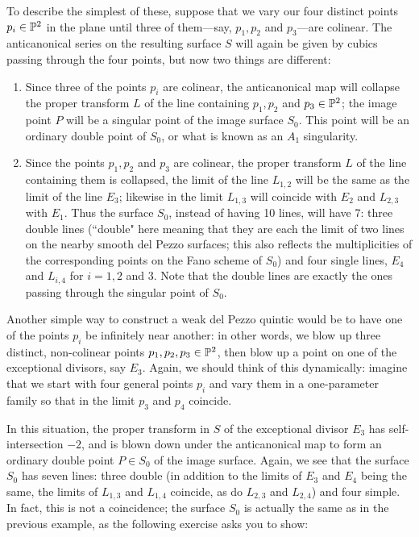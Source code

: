 To describe the simplest of these, suppose that we vary our four distinct points  $p_i \in \PP^2$ in the plane until three of them---say, $p_1, p_2$ and $p_3$---are colinear. The anticanonical series on the resulting surface $S$ will again be given by cubics passing through the four points, but now two things are different:

\begin{enumerate}

\item Since three of the points $p_i$ are colinear, the anticanonical map will collapse the proper transform $L$ of the line containing $p_1, p_2$ and $p_3 \in \PP^2$; the image point $P$ will be a singular point of the image surface $S_0$. This point will be an ordinary double point of $S_0$, or what is known as an $A_1$ singularity.

\item Since the points $p_1, p_2$ and $p_3$ are colinear, the proper transform $L$ of the line containing them is collapsed, the limit of the line $L_{1,2}$ will be the same as the limit of the line $E_3$; likewise in the limit $L_{1,3}$ will coincide with $E_2$ and $L_{2,3}$ with $E_1$. Thus the surface $S_0$, instead of having 10 lines, will have 7: three double lines (``double" here meaning that they are each the limit of two lines on the nearby smooth del Pezzo surfaces; this also reflects the multiplicities of the corresponding points on the Fano scheme of $S_0$) and four single lines, $E_4$ and $L_{i,4}$ for $i = 1, 2$ and $3$. Note that the double lines are exactly the ones passing through the singular point of $S_0$.

\end{enumerate}

Another simple way to construct a weak del Pezzo quintic would be to have one of the points $p_i$ be infinitely near another: in other words, we blow up three distinct, non-colinear points $p_1,p_2, p_3 \in \PP^2$, then blow up a point on one of the exceptional divisors, say $E_3$. Again, we should think of this dynamically: imagine that we start with four general points $p_i$ and vary them in a one-parameter family so that in the limit $p_3$ and $p_4$ coincide.

In this situation, the proper transform in $S$ of the exceptional divisor $E_3$ has self-intersection $-2$, and is blown down under the anticanonical map to form an ordinary double point $P \in S_0$ of the image surface. Again, we see that the surface $S_0$ has seven lines: three double (in addition to the limits of $E_3$ and $E_4$ being the same, the limits of $L_{1,3}$ and $L_{1,4}$ coincide, as do $L_{2,3}$ and $L_{2,4}$) and four simple. In fact, this is not a coincidence; the surface $S_0$ is actually the same as in the previous example, as the following exercise asks you to show:

